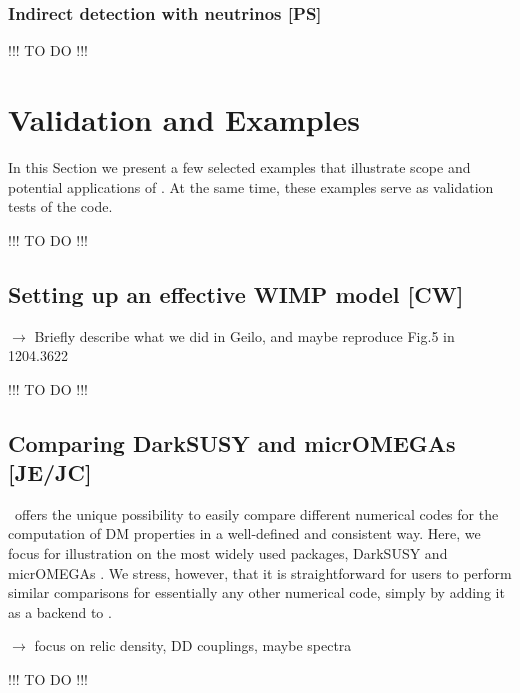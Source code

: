 \subsubsection{Indirect detection with neutrinos {\bf [PS]}}
\label{code_nu}
\smallskip
{\color{red} !!! TO DO !!!}
\smallskip




\section{Validation and  Examples}
\label{examples}

In this Section we present a few selected  examples that illustrate scope and
potential applications of \DB. At the same time, these examples serve as validation
tests of the code.

\smallskip
{\color{red} !!! TO DO !!!}
\smallskip


\subsection{Setting up an effective WIMP model {\bf [CW]}}

$\to$ Briefly describe what we did in Geilo, and maybe reproduce Fig.5 in 1204.3622

\smallskip
{\color{red} !!! TO DO !!!}
\smallskip


\subsection{Comparing {\sf DarkSUSY} and {\sf micrOMEGAs} {\bf [JE/JC]}}

\DB\ offers the unique possibility to easily compare different numerical codes for the computation of DM properties
in a well-defined and consistent way. Here, we focus for illustration on the most widely used packages, {\sf DarkSUSY} 
\cite{xxx} and {\sf micrOMEGAs} \cite{xxx}. We stress, however, that it is straightforward for users to 
perform similar comparisons for essentially any other numerical code, simply by adding it as a backend to \DB.

\medskip
$\to$ focus on relic density, DD couplings, maybe spectra

\smallskip
{\color{red} !!! TO DO !!!}
\smallskip



